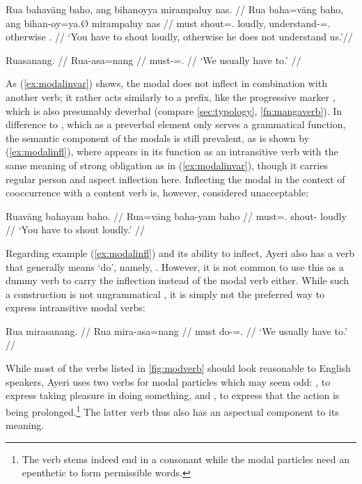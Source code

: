 \pex
\a\label{ex:modalinvar}\begingl
	\gla Rua bahavāng baho, ang bihanoyya mirampaluy nas. //
	\glb Rua baha=vāng baho, ang bihan-oy=ya.Ø mirampaluy nas //
	\glc must shout=\Ssg{}.\Aarg{} loudly, \AgtT{} 
		understand-\Neg{}=\TsgM{}.\Top{} otherwise \Fpl{}.\Parg{} //
	\glft `You have to shout loudly, otherwise he does not understand 
		us.'//
\endgl

\a\label{ex:modalinfl}\begingl
	\gla Ruasanang. //
	\glb Rua-asa=nang //
	\glc must-\Hab{}=\Fpl{}.\Aarg{} //
	\glft `We usually have to.' //
\endgl

\xe

As (\ref{ex:modalinvar}) shows, the modal does not inflect in combination with
another verb; it rather acts similarly to a prefix, like the progressive marker
, which is also presumably deverbal (compare
\autoref{sec:typology}, \autoref{fn:mangaverb}). In difference to
, which as a preverbal element only serves a grammatical
function, the semantic component of the modals is still prevalent, as is shown
by (\ref{ex:modalinfl}), where  appears in its function as
an intransitive verb with the same meaning of strong obligation as in
(\ref{ex:modalinvar}), though it carries regular person and aspect inflection
here. Inflecting the modal in the context of cooccurrence with a content verb
is, however, considered unacceptable:

\ex\ljudge*\begingl
	\gla Ruavāng bahayam baho. //
	\glb Rua=vāng baha-yam baho //
	\glc must=\Ssg{}.\AgtT{} shout-\Ptcp{} loudly //
	\glft `You have to shout loudly.' //
\endgl\xe

Regarding example (\ref{ex:modalinfl}) and its ability to inflect, Ayeri also
has a verb that generally means `do', namely, . However, it
is not common to use this as a dummy verb to carry the inflection instead of
the modal verb either. While such a construction is not ungrammatical , it is simply not the preferred way to express intransitive modal verbs:

\ex\ljudge\ques\begingl
	\gla Rua mirasanang. //
	\glb Rua mira-asa=nang //
	\glc must do-\Hab{}=\Fpl{}.\Aarg{} //
	\glft `We usually have to.' //
\endgl\xe

While most of the verbs listed in \autoref{fig:modverb} should look 
reasonable to English speakers, Ayeri uses two verbs for modal particles which 
may seem odd: , to express taking pleasure in doing 
something, and , to express that the action is 
being prolonged.\footnote{The verb stems indeed end in a consonant while the 
modal particles need an epenthetic  to form permissible words.} The 
latter verb thus also has an aspectual component to its meaning.

